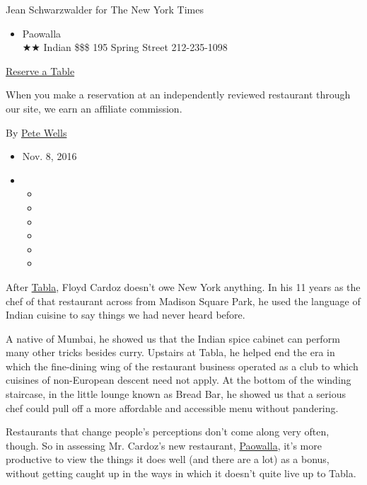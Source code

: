 Jean Schwarzwalder for The New York Times

\begin{itemize}
\tightlist
\item
  Paowalla\\
  ★★ Indian \$\$\$ 195 Spring Street 212-235-1098
\end{itemize}

\href{https://resy.com/cities/ny/paowalla?utm_source=nyt\&utm_medium=restoprofile\&utm_campaign=affiliates\&aff_id=c1fe784}{Reserve
a Table}

When you make a reservation at an independently reviewed restaurant
through our site, we earn an affiliate commission.

By \href{http://www.nytimes3xbfgragh.onion/by/pete-wells}{Pete Wells}

\begin{itemize}
\item
  Nov. 8, 2016
\item
  \begin{itemize}
  \item
  \item
  \item
  \item
  \item
  \item
  \end{itemize}
\end{itemize}

After
\href{http://events.nytimes3xbfgragh.onion/mem/nycreview.html?res=9C03EFDA103DF937A15751C0A96F958260}{Tabla},
Floyd Cardoz doesn't owe New York anything. In his 11 years as the chef
of that restaurant across from Madison Square Park, he used the language
of Indian cuisine to say things we had never heard before.

A native of Mumbai, he showed us that the Indian spice cabinet can
perform many other tricks besides curry. Upstairs at Tabla, he helped
end the era in which the fine-dining wing of the restaurant business
operated as a club to which cuisines of non-European descent need not
apply. At the bottom of the winding staircase, in the little lounge
known as Bread Bar, he showed us that a serious chef could pull off a
more affordable and accessible menu without pandering.

Restaurants that change people's perceptions don't come along very
often, though. So in assessing Mr. Cardoz's new restaurant,
\href{http://www.paowalla.com/}{Paowalla}, it's more productive to view
the things it does well (and there are a lot) as a bonus, without
getting caught up in the ways in which it doesn't quite live up to
Tabla.

